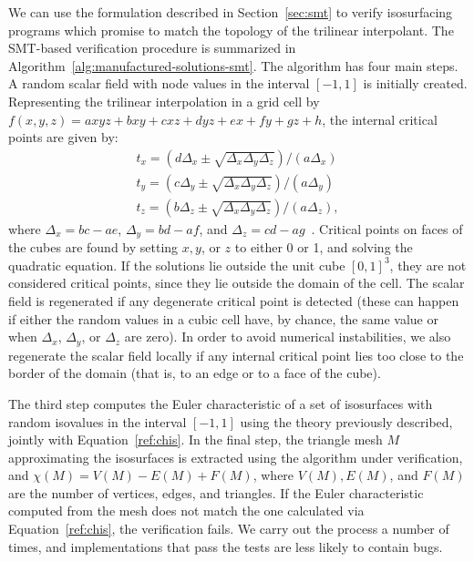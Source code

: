 We can use the formulation described in Section~\ref{sec:smt} to
verify isosurfacing programs which promise to match the
topology of the trilinear interpolant.
The SMT-based verification procedure is summarized in
Algorithm~\ref{alg:manufactured-solutions-smt}. The algorithm 
has four main steps. A random scalar field with node values in the
interval $[-1,1]$ is initially created. Representing the trilinear
interpolation in a grid cell by $f(x,y,z) = axyz + bxy + cxz + dyz + ex + fy + gz + h$,
the internal critical points are given by:
\[\begin{array}{ccc}
t_x = (d \Delta_x \pm \sqrt{\Delta_x \Delta_y \Delta_z})/({a \Delta_x})\\
t_y = (c \Delta_y \pm \sqrt{\Delta_x \Delta_y \Delta_z})/({a \Delta_y})\\
t_z = (b \Delta_z \pm \sqrt{\Delta_x \Delta_y \Delta_z})/({a \Delta_z}),
\end{array}\]
\noindent where $\Delta_x = bc-ae$, $\Delta_y = bd-af$, and $\Delta_z
= cd-ag$~\cite{Pascucci03}.  Critical points on faces of the cubes are found by setting
$x,y$, or $z$ to either 0 or 1, and solving
the quadratic equation.  
If the solutions lie outside the unit cube $[0, 1]^3$, they are not
considered critical points, since they lie outside the domain of the cell. The scalar field
is regenerated if any degenerate critical point is detected (these
can happen if either the random values in a cubic cell have, by chance, the same value or when 
$\Delta_x$, $\Delta_y$, or $\Delta_z$ are zero). In order
to avoid numerical instabilities, we also regenerate the scalar field
locally if any internal critical point lies too close to the border of
the domain (that is, to an edge or to a face of the cube).

The third step computes the Euler characteristic of a set of
isosurfaces with random isovalues in the interval $[-1, 1]$ using the
theory previously described, jointly with Equation~\eqref{ref:chis}.  In
the final step, the triangle mesh $M$ approximating the isosurfaces is
extracted using the algorithm under verification, and $\chi(M) = V(M)
- E(M) + F(M)$, where $V(M),E(M)$, and $F(M)$ are the number of
vertices, edges, and triangles. If the Euler characteristic computed
from the mesh does not match the one calculated via
Equation~\eqref{ref:chis}, the verification fails. We carry out the
process a number of times, and implementations that pass the tests are
less likely to contain bugs.

